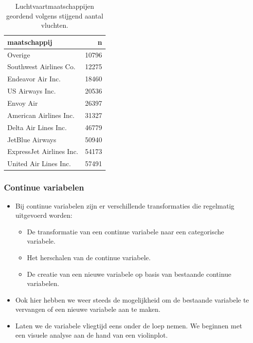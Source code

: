 \documentclass[]{tufte-book}
\providecommand{\tightlist}{%
  \setlength{\itemsep}{0pt}\setlength{\parskip}{0pt}}
\begin{document}
\begin{table}

\caption{\label{tab:5-24b}Luchtvaartmaatschappijen geordend volgens stijgend aantal vluchten.}
\centering
\fontsize{10}{12}\selectfont
\begin{tabular}[t]{lr}
\toprule
maatschappij & n\\
\midrule
Overige & 10796\\
Southwest Airlines Co. & 12275\\
Endeavor Air Inc. & 18460\\
US Airways Inc. & 20536\\
Envoy Air & 26397\\
\addlinespace
American Airlines Inc. & 31327\\
Delta Air Lines Inc. & 46779\\
JetBlue Airways & 50940\\
ExpressJet Airlines Inc. & 54173\\
United Air Lines Inc. & 57491\\
\bottomrule
\end{tabular}
\end{table}

\hypertarget{continue-variabelen-1}{%
\subsubsection{Continue variabelen}\label{continue-variabelen-1}}

\begin{itemize}
\tightlist
\item
  Bij continue variabelen zijn er verschillende transformaties die regelmatig uitgevoerd worden:

  \begin{itemize}
  \tightlist
  \item
    De transformatie van een continue variabele naar een categorische variabele.
  \item
    Het herschalen van de continue variabele.
  \item
    De creatie van een nieuwe variabele op basis van bestaande continue variabelen.
  \end{itemize}
\item
  Ook hier hebben we weer steeds de mogelijkheid om de bestaande variabele te vervangen of een nieuwe variabele aan te maken.
\item
  Laten we de variabele vliegtijd eens onder de loep nemen. We beginnen met een visuele analyse aan de hand van een violinplot.
\end{itemize}
\end{document}
